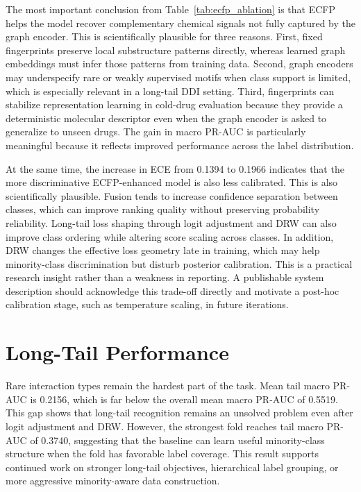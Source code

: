 \documentclass[12pt,a4paper]{report}
\begin{document}
The most important conclusion from Table~\ref{tab:ecfp_ablation} is that ECFP helps the model recover complementary chemical signals not fully captured by the graph encoder. This is scientifically plausible for three reasons. First, fixed fingerprints preserve local substructure patterns directly, whereas learned graph embeddings must infer those patterns from training data. Second, graph encoders may underspecify rare or weakly supervised motifs when class support is limited, which is especially relevant in a long-tail DDI setting. Third, fingerprints can stabilize representation learning in cold-drug evaluation because they provide a deterministic molecular descriptor even when the graph encoder is asked to generalize to unseen drugs. The gain in macro PR-AUC is particularly meaningful because it reflects improved performance across the label distribution.

At the same time, the increase in ECE from 0.1394 to 0.1966 indicates that the more discriminative ECFP-enhanced model is also less calibrated. This is also scientifically plausible. Fusion tends to increase confidence separation between classes, which can improve ranking quality without preserving probability reliability. Long-tail loss shaping through logit adjustment and DRW can also improve class ordering while altering score scaling across classes. In addition, DRW changes the effective loss geometry late in training, which may help minority-class discrimination but disturb posterior calibration. This is a practical research insight rather than a weakness in reporting. A publishable system description should acknowledge this trade-off directly and motivate a post-hoc calibration stage, such as temperature scaling, in future iterations.

\section{Long-Tail Performance}
Rare interaction types remain the hardest part of the task. Mean tail macro PR-AUC is 0.2156, which is far below the overall mean macro PR-AUC of 0.5519. This gap shows that long-tail recognition remains an unsolved problem even after logit adjustment and DRW. However, the strongest fold reaches tail macro PR-AUC of 0.3740, suggesting that the baseline can learn useful minority-class structure when the fold has favorable label coverage. This result supports continued work on stronger long-tail objectives, hierarchical label grouping, or more aggressive minority-aware data construction.
\end{document}
